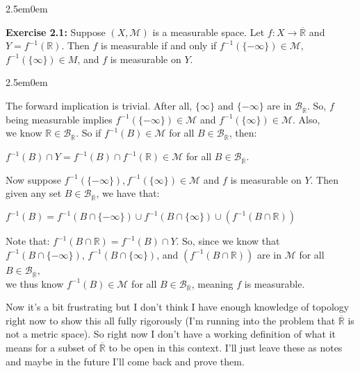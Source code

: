 \documentclass{book}
\newcommand{\exOne}{%
   \color{Purple}%
   \fontsize{13}{15}\selectfont%
}
\newcommand{\exTwoP}{%
   \color{RedViolet}%
   \fontsize{13}{15}\selectfont%
}
\newenvironment{myIndent}{%
   \begin{adjustwidth}{2.5em}{0em}%
}{%
   \end{adjustwidth}%
}
\newcommand{\blab}[1]{\textbf{#1}}
\newcommand{\retTwo}{\hfill\bigbreak}
\begin{document}
\begin{myIndent}\exOne
   \blab{Exercise 2.1:} Suppose $(X, \mathcal{M})$ is a measurable space. Let $f: X \longrightarrow \overline{\mathbb{R}}$ and\\ $Y = f^{-1}(\mathbb{R})$. Then $f$ is measurable if and only if $f^{-1}(\{-\infty\}) \in \mathcal{M}$,\\ $f^{-1}(\{\infty\}) \in M$, and $f$ is measurable on $Y$.\retTwo

   \begin{myIndent}\exTwoP
      The forward implication is trivial. After all, $\{\infty\}$ and $\{-\infty\}$ are in $\mathcal{B}_{\overline{\mathbb{R}}}$. So, $f$ being measurable implies $f^{-1}(\{-\infty\}) \in \mathcal{M}$ and $f^{-1}(\{\infty\}) \in \mathcal{M}$. Also,\\ we know $\mathbb{R} \in \mathcal{B}_{\overline{\mathbb{R}}}$. So if $f^{-1}(B) \in \mathcal{M}$ for all $B \in \mathcal{B}_{\overline{\mathbb{R}}}$, then: 
      
      {\center $f^{-1}(B) \cap Y = f^{-1}(B) \cap f^{-1}(\mathbb{R}) \in \mathcal{M}$ for all $B \in \mathcal{B}_{\overline{\mathbb{R}}}$.\retTwo\par}

      Now suppose $f^{-1}(\{-\infty\}), f^{-1}(\{\infty\}) \in \mathcal{M}$ and $f$ is measurable on $Y$. Then given any set $B \in \mathcal{B}_{\overline{\mathbb{R}}}$, we have that:

      {\center $f^{-1}(B) = f^{-1}(B \cap \{-\infty\}) \cup f^{-1}(B \cap \{\infty\}) \cup (f^{-1}(B \cap \mathbb{R}))$ \retTwo\par}

      Note that: $f^{-1}(B \cap \mathbb{R}) = f^{-1}(B) \cap Y$. So, since we know that\\ $f^{-1}(B \cap \{-\infty\})$, $f^{-1}(B \cap \{\infty\})$, and $(f^{-1}(B \cap \mathbb{R}))$ are in $\mathcal{M}$ for all $B \in \mathcal{B}_{\overline{\mathbb{R}}}$,\\ we thus know $f^{-1}(B) \in \mathcal{M}$ for all $B \in \mathcal{B}_{\overline{\mathbb{R}}}$, meaning $f$ is measurable.\newpage
   \end{myIndent}
\end{myIndent}

Now it's a bit frustrating but I don't think I have enough knowledge of topology right now to show this all fully rigorously (I'm running into the problem that $\overline{\mathbb{R}}$ is not a metric space). So right now I don't have a working definition of what it means for a subset of $\overline{\mathbb{R}}$ to be open in this context. I'll just leave these as notes and maybe in the future I'll come back and prove them.
\end{document}

